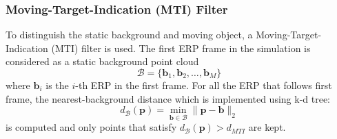 \subsubsection{Moving-Target-Indication (MTI) Filter}
\label{subsubsec:mti-filter}

To distinguish the static background and moving object, a Moving-Target-Indication (MTI) filter is used.
The first ERP frame in the simulation is considered as a static background point cloud
\begin{equation}
    \mathcal{B} = \{\mathbf{b}_1,\mathbf{b}_2,\ldots,\mathbf{b}_M\}
\end{equation}
where $\mathbf{b}_i$ is the $i$-th ERP in the first frame.
For all the ERP that follows first frame, the nearest-background distance which is implemented using k-d tree:
\begin{equation}
    d_{\mathcal{B}}(\mathbf{p}) = \min_{\mathbf{b}\in\mathcal{B}}\|\mathbf{p}-\mathbf{b}\|_2
\end{equation} is computed and only points that satisfy $d_{\mathcal{B}}(\mathbf{p})>d_{MTI}$ are kept.